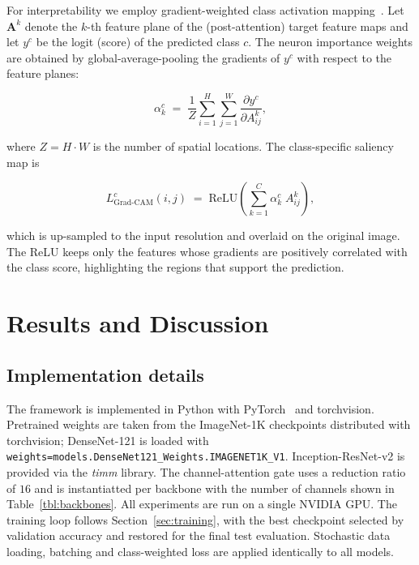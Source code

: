 \documentclass[a4paper,fleqn]{cas-dc}
\begin{document}
For interpretability we employ gradient-weighted class activation
mapping~\cite{selvaraju_gradcam}. Let $\mathbf{A}^k$ denote the $k$-th
feature plane of the (post-attention) target feature maps and let $y^{c}$ be
the logit (score) of the predicted class $c$. The neuron importance weights
are obtained by global-average-pooling the gradients of $y^c$ with respect
to the feature planes:

\begin{equation}\label{eq:gradcamw}
  \alpha_k^{c} \;=\;
  \frac{1}{Z}\sum_{i=1}^{H}\sum_{j=1}^{W}
  \frac{\partial y^{c}}{\partial A^{k}_{ij}},
\end{equation}

where $Z = H\cdot W$ is the number of spatial locations. The class-specific
saliency map is

\begin{equation}\label{eq:gradcamm}
  L^{c}_{\text{Grad-CAM}}(i,j) \;=\;
  \mathrm{ReLU}\!\left(\sum_{k=1}^{C} \alpha_k^{c}\; A^{k}_{ij}\right),
\end{equation}

which is up-sampled to the input resolution and overlaid on the original
image. The ReLU keeps only the features whose gradients are positively
correlated with the class score, highlighting the regions that support the
prediction.

\section{Results and Discussion}\label{sec:results}

\subsection{Implementation details}

The framework is implemented in Python with PyTorch~\cite{paszke_pytorch} and
torchvision. Pretrained weights are taken from the ImageNet-1K checkpoints
distributed with torchvision; DenseNet-121 is loaded with
\verb|weights=models.DenseNet121_Weights.IMAGENET1K_V1|. Inception-ResNet-v2
is provided via the \emph{timm} library. The channel-attention gate uses a
reduction ratio of $16$ and is instantiatted per backbone with the number of
channels shown in Table~\ref{tbl:backbones}. All experiments are run on a
single NVIDIA GPU. The training loop follows Section~\ref{sec:training},
with the best checkpoint selected by validation accuracy and restored for the
final test evaluation. Stochastic data loading, batching and class-weighted
loss are applied identically to all models.
\end{document}
